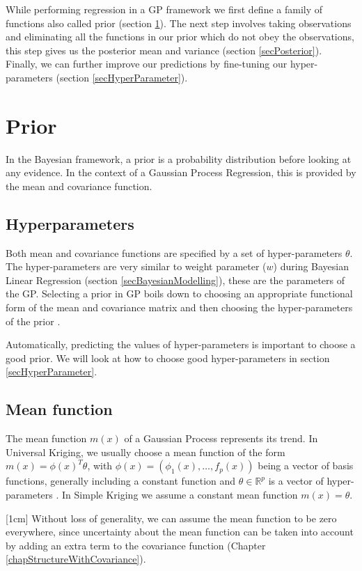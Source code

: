 While performing regression in a GP framework we first define a family of functions also called prior (section \ref{secPrior}). The next step involves taking observations and eliminating all the functions in our prior which do not obey the observations, this step gives us the posterior mean and variance (section \ref{secPosterior}). Finally, we can further improve our predictions by fine-tuning our hyper-parameters (section \ref{secHyperParameter}).

\section{Prior} \label{secPrior}
In the Bayesian framework, a prior is a probability distribution before looking at any evidence. In the context of a Gaussian Process Regression, this is provided by the mean and covariance function. 

\subsection{Hyperparameters}
Both mean and covariance functions are specified by a set of hyper-parameters \(\theta\). The hyper-parameters are very similar to weight parameter (\(w\)) during Bayesian Linear Regression (section \ref{secBayesianModelling}), these are the parameters of the GP. Selecting a prior in GP boils down to choosing an appropriate functional form of the mean and covariance matrix and then choosing the hyper-parameters of the prior \cite{duvenaud2013structure}. 

Automatically, predicting the values of hyper-parameters is important to choose a good prior. We will look at how to choose good hyper-parameters in section \ref{secHyperParameter}. 

\subsection{Mean function}\label{subSecCH2MeanFunction}
The mean function \(m(x)\) of a Gaussian Process represents its trend. In Universal Kriging, we usually choose a mean function of the form \(m(x) = \phi(x)^{T}\theta\), with \(\phi(x) = (\phi_{1}(x), \ldots , f_{p}(x))\) being a vector of basis functions, generally including a constant function and \(\theta \in \mathbb{R}^{p}\) is a vector of hyper-parameters \cite{matheron1963principles}. In Simple Kriging we assume a constant mean function \(m(x) = \theta\).

[1cm]
Without loss of generality, we can assume the mean function to be zero everywhere, since uncertainty about the mean function can be taken into account by adding an extra term to the covariance function (Chapter \ref{chapStructureWithCovariance}).  

